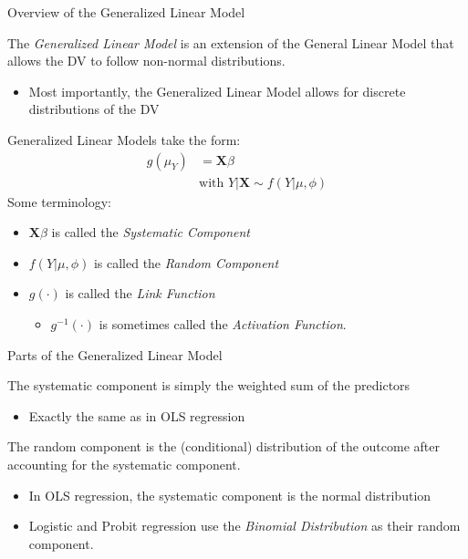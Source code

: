 \documentclass{beamer}
\begin{document}
\begin{frame}{Overview of the Generalized Linear Model}

  The \emph{Generalized Linear Model} is an extension of the General
  Linear Model that allows the DV to follow non-normal distributions.
  \vspace{6pt}
  \begin{itemize}
  \item Most importantly, the Generalized Linear Model allows for
    discrete distributions of the DV
  \end{itemize}
  \vspace{12pt}
  Generalized Linear Models take the form:
  \begin{align*}
    g(\mu_Y) &= \mathbf{X}\beta\\
             &\text{with } Y | \mathbf{X} \sim f(Y | \mu, \phi)
  \end{align*}
  Some terminology:
  \begin{itemize}
  \item $\mathbf{X}\beta$ is called the \emph{Systematic Component}
  \item $f(Y | \mu, \phi)$ is called the \emph{Random Component}
  \item $g(\cdot)$ is called the \emph{Link Function}
    \begin{itemize}
    \item $g^{-1}(\cdot)$ is sometimes called the \emph{Activation
        Function}.
    \end{itemize}
  \end{itemize}

\end{frame}


\begin{frame}{Parts of the Generalized Linear Model}

  The systematic component is simply the weighted sum of the predictors
  \begin{itemize}
  \item Exactly the same as in OLS regression
  \end{itemize}
  \vspace{12pt}
  \pause
  The random component is the (conditional) distribution of the outcome
  after accounting for the systematic component.
  \begin{itemize}
  \item In OLS regression, the systematic component is the normal
    distribution
  \item Logistic and Probit regression use the \emph{Binomial
      Distribution} as their random component.
  \end{itemize}

\end{frame}
\end{document}
